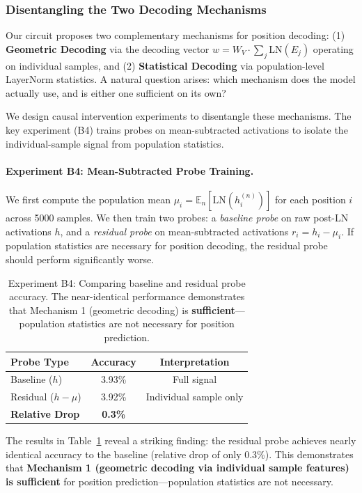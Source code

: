 \documentclass[11pt]{article}
\begin{document}
\subsubsection{Disentangling the Two Decoding Mechanisms}

Our circuit proposes two complementary mechanisms for position decoding: (1) \textbf{Geometric Decoding} via the decoding vector $w = W_V \cdot \sum_j \text{LN}(E_j)$ operating on individual samples, and (2) \textbf{Statistical Decoding} via population-level LayerNorm statistics. A natural question arises: which mechanism does the model actually use, and is either one sufficient on its own?

We design causal intervention experiments to disentangle these mechanisms. The key experiment (B4) trains probes on mean-subtracted activations to isolate the individual-sample signal from population statistics.

\paragraph{Experiment B4: Mean-Subtracted Probe Training.}
We first compute the population mean $\mu_i = \mathbb{E}_n[\text{LN}(h_i^{(n)})]$ for each position $i$ across 5000 samples. We then train two probes: a \textit{baseline probe} on raw post-LN activations $h$, and a \textit{residual probe} on mean-subtracted activations $r_i = h_i - \mu_i$. If population statistics are necessary for position decoding, the residual probe should perform significantly worse.

\begin{table}[htbp]
\centering
\small
\begin{tabular}{lcc}
\toprule
\textbf{Probe Type} & \textbf{Accuracy} & \textbf{Interpretation} \\
\midrule
Baseline ($h$) & 3.93\% & Full signal \\
Residual ($h - \mu$) & 3.92\% & Individual sample only \\
\midrule
\textbf{Relative Drop} & \textbf{0.3\%} & \\
\bottomrule
\end{tabular}
\caption{Experiment B4: Comparing baseline and residual probe accuracy. The near-identical performance demonstrates that Mechanism 1 (geometric decoding) is \textbf{sufficient}---population statistics are not necessary for position prediction.}
\label{tab:b4-results}
\end{table}

The results in Table~\ref{tab:b4-results} reveal a striking finding: the residual probe achieves nearly identical accuracy to the baseline (relative drop of only 0.3\%). This demonstrates that \textbf{Mechanism 1 (geometric decoding via individual sample features) is sufficient} for position prediction---population statistics are not necessary.
\end{document}
